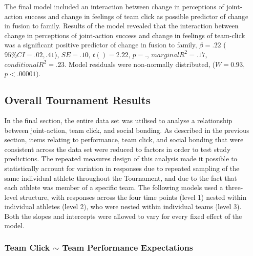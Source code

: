 \documentclass[12pt]{report}
\begin{document}
{The final model included an interaction between change in perceptions of joint-action success and change in feelings of team click as possible predictor of change in fusion to family.  Results of the model revealed that the interaction between change in perceptions of joint-action success and change in feelings of team-click was a significant positive predictor of change in fusion to family, $\beta = .22$ ($95\% CI =  .02, .41$), $SE = .10$, $t() = 2.22$, $p = .$, $marginal R^2 = .17$, $conditional R^2 = .23$. Model residuals were non-normally distributed, ($W = 0.93$, $p < .00001$).























\subsection{Overall Tournament Results}
In the final section, the entire data set was utilised to analyse a relationship between joint-action, team click, and social bonding. As described in the previous section, items relating to performance, team click, and social bonding that were consistent across the data set were reduced to factors in order to test study predictions. The repeated measures design of this analysis made it possible to statistically account for variation in responses due to repeated sampling of the same individual athlete throughout the Tournament, and due to the fact that each athlete was member of a specific team. The following models used a three-level structure, with responses across the four time points (level 1) nested within individual athletes (level 2), who were nested within individual teams (level 3). Both the slopes and intercepts were allowed to vary for every fixed effect of the model.


\subsubsection{Team Click $\sim$ Team Performance Expectations}

}
\end{document}
